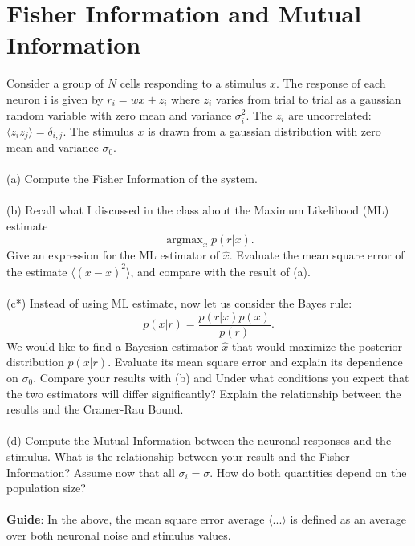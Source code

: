 \documentclass{article}
\DeclareMathOperator*{\argmax}{argmax}
\begin{document}
\section*{Fisher Information and Mutual Information}
Consider a group of $N$ cells responding to a stimulus $x$. The response of each neuron i is given by $r_i = w x + z_i$ where $z_i$ varies from trial to trial as a gaussian random variable with zero mean and variance $\sigma_i^2$. The $z_i$ are uncorrelated: $\langle z_i z_j\rangle = \delta_{i,j}$. The stimulus $x$ is drawn from a gaussian distribution with zero mean and variance $\sigma_0$.
\\
\\
(a) Compute the Fisher Information of the system.
\\
\\
(b) Recall what I discussed in the class about the Maximum Likelihood (ML) estimate \[\argmax_x p(r|x).\] Give an expression for the ML estimator of $\hat{x}$. Evaluate the mean square error of the estimate $\langle (x -\hat{x})^2 \rangle$, and compare with the result of (a).
\\
\\
(c*) Instead of using ML estimate, now let us consider the Bayes rule:
\begin{equation}
p(x|r) = \frac{p(r|x)p(x)}{p(r)}.
\end{equation}
We would like to find a Bayesian estimator $\hat{x}$ that would maximize the posterior distribution $p(x|r)$. Evaluate its mean square error and explain its dependence on $\sigma_0$. Compare your results with (b) and Under what conditions you expect that the two estimators will differ significantly? Explain the relationship between the results and the Cramer-Rau Bound. 
\\
\\
(d) Compute the Mutual Information between the neuronal responses and the stimulus. What is the relationship between your result and the Fisher Information? Assume now that all $\sigma_i = \sigma$. How do both quantities depend on the population size?
\\
\\
\textbf{Guide}: In the above, the mean square error average $\langle...\rangle$ is defined as an average over both neuronal noise and stimulus values. 
\end{document}
